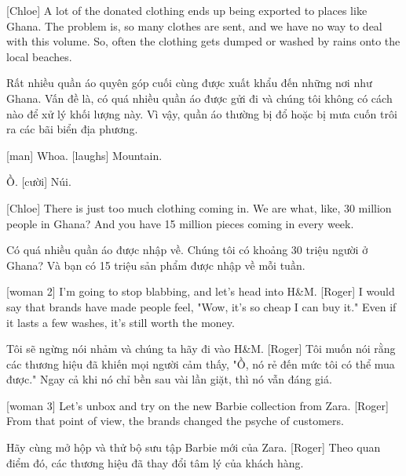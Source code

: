 \documentclass[a4paper]{article}
\begin{document}
	[Chloe] A lot of the donated clothing ends up being exported to places like Ghana.
	The problem is, so many clothes are sent, and we have no way to deal with this volume.
	So, often the clothing gets dumped or washed by rains onto the local beaches.
	
	\begin{vietnamese-v2}
		[Chloe] Rất nhiều quần áo quyên góp cuối cùng được xuất khẩu đến những nơi như Ghana.
		Vấn đề là, có quá nhiều quần áo được gửi đi và chúng tôi không có cách nào để xử lý khối lượng này.
		Vì vậy, quần áo thường bị đổ hoặc bị mưa cuốn trôi ra các bãi biển địa phương.
	\end{vietnamese-v2}
	
	[man] Whoa.
	[laughs]
	Mountain.
	
	\begin{vietnamese-v2}
		 Ồ.
		[cười]
		Núi.
	\end{vietnamese-v2}
	
	[Chloe] There is just too much clothing coming in.
	We are what, like, 30 million people in Ghana?
	And you have 15 million pieces coming in every week.
	
	\begin{vietnamese-v2}
		[Chloe] Có quá nhiều quần áo được nhập về.
		Chúng tôi có khoảng 30 triệu người ở Ghana?
		Và bạn có 15 triệu sản phẩm được nhập về mỗi tuần.
	\end{vietnamese-v2}
	
	[woman 2] I'm going to stop blabbing, and let's head into H\&M.
	[Roger] I would say that brands have made people feel, "Wow, it's so cheap I can buy it."
	Even if it lasts a few washes, it's still worth the money.
	
	\begin{vietnamese-v2}
		 Tôi sẽ ngừng nói nhảm và chúng ta hãy đi vào H\&M.
		[Roger] Tôi muốn nói rằng các thương hiệu đã khiến mọi người cảm thấy, "Ồ, nó rẻ đến mức tôi có thể mua được."
		Ngay cả khi nó chỉ bền sau vài lần giặt, thì nó vẫn đáng giá.
	\end{vietnamese-v2}
	
	
	[woman 3] Let's unbox and try on the new Barbie collection from Zara.
	[Roger] From that point of view, the brands changed the psyche of customers.
	
	\begin{vietnamese-v2}
		[phụ nữ 3] Hãy cùng mở hộp và thử bộ sưu tập Barbie mới của Zara.
		[Roger] Theo quan điểm đó, các thương hiệu đã thay đổi tâm lý của khách hàng.
	\end{vietnamese-v2}
	
\end{document}
